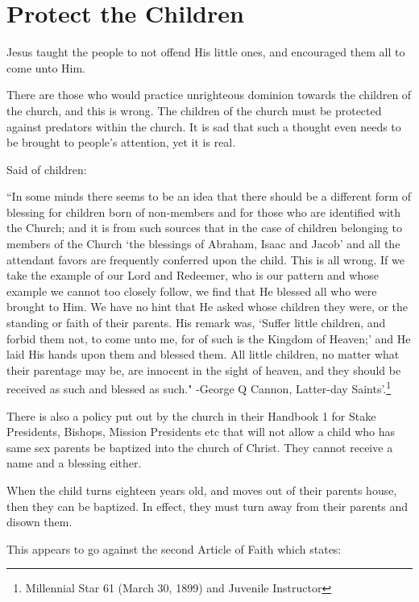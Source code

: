 \chapter{Protect the Children}

Jesus taught the people to not offend His little ones, and encouraged them all to
come unto Him.

There are those who would practice unrighteous dominion towards the children of the
church, and this is wrong. The children of the church must be protected against
predators within the church. It is sad that such a thought even needs to be brought
to people's attention, yet it is real.

Said of children:

\begin{displayquote}
``In some minds there seems to be an idea that there should be a different form of
blessing for children born of non-members and for those who are identified with the
Church; and it is from such sources that in the case of children belonging to members
of the Church `the blessings of Abraham, Isaac and Jacob' and all the attendant
favors are frequently conferred upon the child. This is all wrong. If we take the
example of our Lord and Redeemer, who is our pattern and whose example we cannot too
closely follow, we find that He blessed all who were brought to Him. We have no hint
that He asked whose children they were, or the standing or faith of their parents.
His remark was, `Suffer little children, and forbid them not, to come unto me, for of
such is the Kingdom of Heaven;' and He laid His hands upon them and blessed them. All
little children, no matter what their parentage may be, are innocent in the sight of
heaven, and they should be received as such and blessed as such." -George Q Cannon,
Latter-day Saints'.\footnote{Millennial Star 61 (March 30, 1899) and Juvenile
Instructor}
\end{displayquote}

There is also a policy put out by the church in their Handbook 1 for Stake
Presidents, Bishops, Mission Presidents etc that will not allow a child who has same
sex parents be baptized into the church of Christ. They cannot receive a name and a
blessing either.

When the child turns eighteen years old, and moves out of their parents house, then
they can be baptized. In effect, they must turn away from their parents and disown
them.

This appears to go against the second Article of Faith which states:

